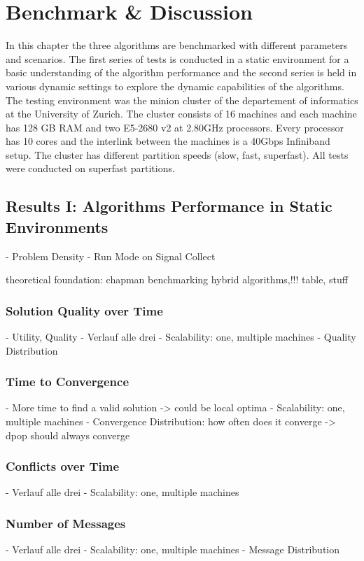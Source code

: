 \chapter{Benchmark \& Discussion}

In this chapter the three algorithms are benchmarked with different parameters and scenarios. The first series of tests is conducted in a static environment for a basic understanding of the algorithm performance and the second series is held in various dynamic settings to explore the dynamic capabilities of the algorithms. The testing environment was the minion cluster of the departement of informatics at the University of Zurich. The cluster consists of 16 machines and each machine has 128 GB RAM and two E5-2680 v2 at 2.80GHz processors. Every processor has 10 cores and the interlink between the machines is a 40Gbps Infiniband setup. The cluster has different partition speeds (slow, fast, superfast). All tests were conducted on superfast partitions.

\section{Results I: Algorithms Performance in Static Environments}

- Problem Density
- Run Mode on Signal Collect

theoretical foundation: chapman benchmarking hybrid algorithms,!!! table, stuff

\subsection{Solution Quality over Time}
- Utility, Quality
- Verlauf alle drei
- Scalability: one, multiple machines
- Quality Distribution

\subsection{Time to Convergence}
- More time to find a valid solution -> could be local optima
- Scalability: one, multiple machines
- Convergence Distribution: how often does it converge -> dpop should always converge

\subsection{Conflicts over Time}
- Verlauf alle drei
- Scalability: one, multiple machines
\subsection{Number of Messages}
-  Verlauf alle drei
- Scalability: one, multiple machines
- Message Distribution


